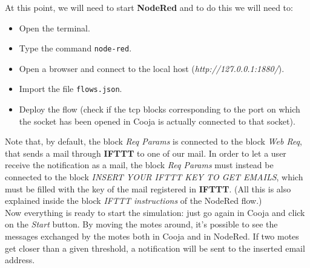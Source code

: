 At this point, we will need to start \textbf{NodeRed} and to do this we will need to:
\begin{itemize}
    \item Open the terminal.
    \item Type the command \texttt{node-red}.
    \item Open a browser and connect to the local host (\textit{http://127.0.0.1:1880/}).
    \item Import the file \texttt{flows.json}.
    \item Deploy the flow (check if the tcp blocks corresponding to the port on which the socket has been opened in 
            Cooja is actually connected to that socket). 
\end{itemize}
Note that, by default, the block \textit{Req Params} is connected to the block \textit{Web Req}, that sends a mail through
\textbf{IFTTT} to one of our mail. In order to let a user receive the notification as a mail, the block \textit{Req Params} must
instead be connected to the block \textit{INSERT YOUR IFTTT KEY TO GET EMAILS}, which must be filled with the key of the mail
registered in \textbf{IFTTT}. (All this is also explained inside the block \textit{IFTTT instructions} of the NodeRed flow.)\\ 

Now everything is ready to start the simulation: just go again in Cooja and click on the \textit{Start} button. By moving the 
motes around, it's possible to see the messages exchanged by the motes both in Cooja and in NodeRed. If two motes get closer 
than a given threshold, a notification will be sent to the inserted email address.